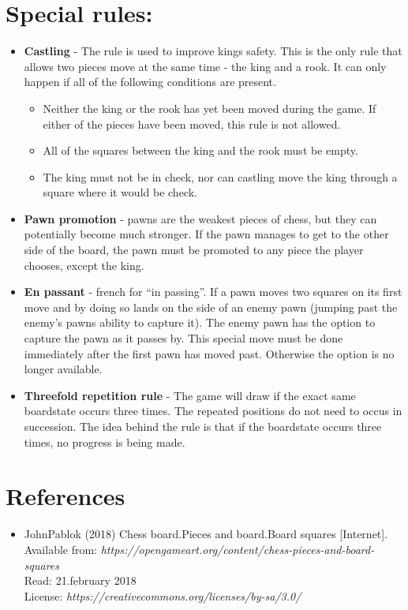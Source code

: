 \documentclass{article}
\begin{document}
\section{Special rules:}
\begin{itemize}

\item \textbf{Castling} - The rule is used to improve kings safety.  This is the only rule that allows two pieces move at the same time - the king and a rook. It can only happen if all of the following conditions are present.

\begin{itemize}
   \item Neither the king or the rook has yet been moved during the game. If either of the pieces have been moved, this rule is not allowed. 
   \item All of the squares between the king and the rook must be empty.
   \item The king must not be in check, nor can castling move the king through a square where it would be check. 
   \end{itemize}

\item \textbf{Pawn promotion} - pawns are the weakest pieces of chess, but they can potentially become much stronger. If the pawn manages to get to the other side of the board, the pawn must be promoted to any piece the player chooses, except the king. 

\item \textbf{En passant} - french for “in passing”. If a pawn moves two squares on its first move and by doing so lands on the side of an enemy pawn (jumping past the enemy’s pawns ability to capture it). The enemy pawn has the option to capture the pawn as it passes by. This special move must be done immediately after the first pawn has moved past. Otherwise the option is no longer available. 

\item \textbf{Threefold repetition rule} - The game will draw if the exact same boardstate occurs three times. The repeated
positions do not need to occus in succession. The idea behind the rule is that if the boardstate occurs three times, no progress
is being made. 
\end{itemize}

\section{References}
\begin{itemize}
\item JohnPablok (2018) Chess board.Pieces and board.Board squares [Internet]. \\
	  Available from: \textit{https://opengameart.org/content/chess-pieces-and-board-squares} \\
	  Read: 21.february 2018\\
	  License: \textit{https://creativecommons.org/licenses/by-sa/3.0/}
\end{itemize}
\end{document}
